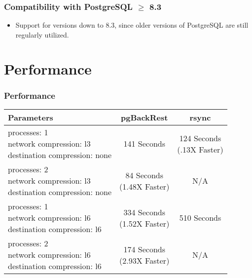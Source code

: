 \begin{frame}
    \frametitle{Compatibility with PostgreSQL $\geqslant$ 8.3}

    \begin{itemize}
        \item Support for versions down to 8.3, since older versions of PostgreSQL are still regularly utilized.
    \end{itemize}
\end{frame}

\section{Performance}

\begin{frame}
    \frametitle{Performance}

    \begin{table}
        \begin{tabular}{l || c | c}
            \bf{Parameters} & \bf{pgBackRest} & \bf{rsync} \\
            \hline \hline
            \pbox{14em}{processes: 1 \\ network compression: l3 \\ destination compression: none} &
                141 Seconds &
                \pbox{14em}{124 Seconds \\ (.13X Faster)} \\ \hline
            \pbox{14em}{processes: 2 \\ network compression: l3 \\ destination compression: none} &
                \pbox{14em}{84 Seconds \\ (1.48X Faster)} &
                N/A \\ \hline
            \pbox{14em}{processes: 1 \\ network compression: l6 \\ destination compression: l6} &
                \pbox{14em}{334 Seconds \\ (1.52X Faster)} &
                510 Seconds \\ \hline
            \pbox{14em}{processes: 2 \\ network compression: l6 \\ destination compression: l6} &
                \pbox{14em}{174 Seconds \\ (2.93X Faster)} &
                N/A
        \end{tabular}
    \end{table}

\end{frame}

